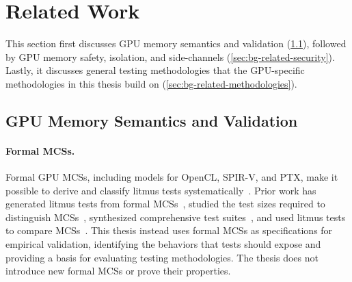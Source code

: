 \section{Related Work}
\label{sec:bg-related-work}

This section first discusses GPU memory semantics and validation (\mysec\ref{sec:bg-related-semantics}), followed by GPU memory safety, isolation, and side-channels (\mysec\ref{sec:bg-related-security}). Lastly, it discusses general testing methodologies that the GPU-specific methodologies in this thesis build on (\mysec\ref{sec:bg-related-methodologies}).

\subsection{GPU Memory Semantics and Validation}
\label{sec:bg-related-semantics}

\paragraph{Formal MCSs.} Formal GPU MCSs, including models for OpenCL, SPIR-V, and PTX, make it possible to derive and classify litmus tests systematically~\cite{batty2016overhauling,vulkan,lustig2019ptx}. Prior work has generated litmus tests from formal MCSs~\cite{alglave2010fences}, studied the test sizes required to distinguish MCSs~\cite{madorhaim2011litmus}, synthesized comprehensive test suites~\cite{lustig2017automated}, and used litmus tests to compare MCSs~\cite{wickerson2017automatically,madorhaim2010generating}. This thesis instead uses formal MCSs as specifications for empirical validation, identifying the behaviors that tests should expose and providing a basis for evaluating testing methodologies. The thesis does not introduce new formal MCSs or prove their properties.

